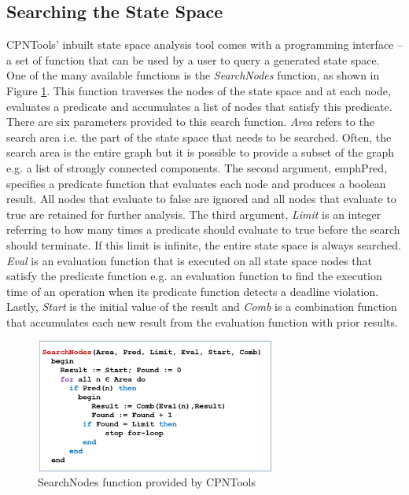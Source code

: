 \subsection{Searching the State Space}

CPNTools' inbuilt state space analysis tool comes with a programming interface -- a set of function that can be used by a user to query a generated state space. One of the many available functions is the \emph{SearchNodes} function, as shown in Figure \ref{fig:SSSearching}. This function traverses the nodes of the state space and at each node, evaluates a predicate and accumulates a list of nodes that satisfy this predicate. There are six parameters provided to this search function. \emph{Area} refers to the search area i.e. the part of the state space that needs to be searched. Often, the search area is the entire graph but it is possible to provide a subset of the graph e.g. a list of strongly connected components. The second argument, emph{Pred}, specifies a predicate function that evaluates each node and produces a boolean result. All nodes that evaluate to false are ignored and all nodes that evaluate to true are retained for further analysis. The third argument, \emph{Limit} is an integer referring to how many times a predicate should evaluate to true before the search should terminate. If this limit is infinite, the entire state space is always searched. \emph{Eval} is an evaluation function that is executed on all state space nodes that satisfy the predicate function e.g. an evaluation function to find the execution time of an operation when its predicate function detects a deadline violation. Lastly, \emph{Start} is the initial value of the result and \emph{Comb} is a combination function that accumulates each new result from the evaluation function with prior results. 

\begin{figure}[htb]
	\centering
	\includegraphics[width=0.7\textwidth]{./img/state-space-searching.png}
	\caption{SearchNodes function provided by CPNTools}
	\label{fig:SSSearching}
\end{figure}
\FloatBarrier


